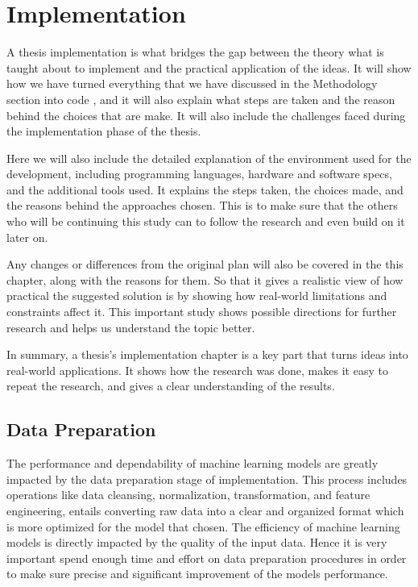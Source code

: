 \documentclass[12pt,onecolumn]{report}
\begin{document}
\section{Implementation}
\label{sec:implementation}
A thesis implementation is what bridges the gap between the theory what is taught about to implement and the practical application of the ideas. It will show how we have turned everything that we have discussed in the Methodology section into code , and it will also explain what steps are taken and the reason behind the choices that are make. It will also include the challenges faced during the implementation phase of the thesis.

Here we will also include the detailed explanation of the environment used for the development, including programming languages, hardware and software specs, and the additional tools used. It explains the steps taken, the choices made, and the reasons behind the approaches chosen. This is to make sure that the others who will be continuing this study can to follow the research and even build on it later on.

Any changes or differences from the original plan will also be covered in the this chapter, along with the reasons for them. So that it gives a realistic view of how practical the suggested solution is by showing how real-world limitations and constraints affect it. This important study shows possible directions for further research and helps us understand the topic better.

In summary, a thesis’s implementation chapter is a key part that turns ideas into real-world applications. It shows how the research was done, makes it easy to repeat the research, and gives a clear understanding of the results.

\subsection{Data Preparation}
The performance and dependability of machine learning models are greatly impacted by the data preparation stage of implementation. This process includes operations like data cleansing, normalization, transformation, and feature engineering, entails converting raw data into a clear and organized format which is more optimized for the model that chosen. The efficiency of machine learning models is directly impacted by the quality of the input data. Hence it is very important spend enough time and effort on data preparation procedures in order to make sure precise and significant improvement of the models performance. 
\end{document}
